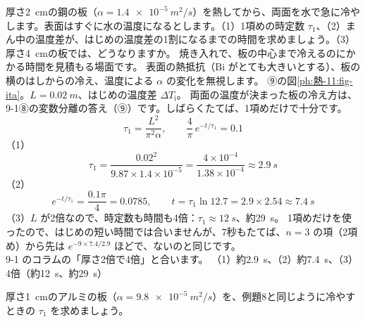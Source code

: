 \label{ph:熱-11:ex8}
\begin{phreidai}[焼き入れの板が冷える時間]
厚さ\qty{2}{cm}の鋼の板（$\alpha=\qty{1.4e-5}{m^2/s}$）を熱してから、両面を水で急に冷やします。表面はすぐに水の温度になるとします。（1）1項めの時定数 $\tau_1$、（2）まん中の温度差が、はじめの温度差の1割になるまでの時間を求めましょう。（3）厚さ\qty{4}{cm}の板では、どうなりますか。
\phbamen
焼き入れで、板の中心まで冷えるのにかかる時間を見積もる場面です。
\phmushi
表面の熱抵抗（$\mathrm{Bi}$ がとても大きいとする）、板の横のはしからの冷え、温度による $\alpha$ の変化を無視します。
\phzu
⑨の図\ref{ph:熱-11:fig-ita}。$L=\qty{0.02}{m}$、はじめの温度差 $\Delta T_{\mathrm i}$。
\phriyu
両面の温度が決まった板の冷え方は、9-1⑧の変数分離の答え（⑨）です。しばらくたてば、1項めだけで十分です。
\phtateru
\[\tau_1=\frac{L^2}{\pi^2\alpha},\qquad\frac{4}{\pi}\,e^{-t/\tau_1}=0.1\]
\phtoku
（1）\[\tau_1=\frac{0.02^2}{9.87\times1.4\times10^{-5}}=\frac{4\times10^{-4}}{1.38\times10^{-4}}\approx\qty{2.9}{s}\]
（2）\[e^{-t/\tau_1}=\frac{0.1\pi}{4}=0.0785,\qquad t=\tau_1\ln12.7=2.9\times2.54\approx\qty{7.4}{s}\]
（3）$L$ が2倍なので、時定数も時間も4倍：$\tau_1\approx\qty{12}{s}$、約\qty{29}{s}。
\phtashikame
1項めだけを使ったので、はじめの短い時間では合いませんが、7秒もたてば、$n=3$ の項（2項め）から先は $e^{-9\times7.4/2.9}$ ほどで、ないのと同じです。\\
9-1 のコラムの「厚さ2倍で4倍」と合います。
\kotae （1）約\qty{2.9}{s}、（2）約\qty{7.4}{s}、（3）4倍（約\qty{12}{s}、約\qty{29}{s}）
\end{phreidai}
\begin{jibun}
厚さ\qty{1}{cm}のアルミの板（$\alpha=\qty{9.8e-5}{m^2/s}$）を、例題8と同じように冷やすときの $\tau_1$ を求めましょう。
\end{jibun}

